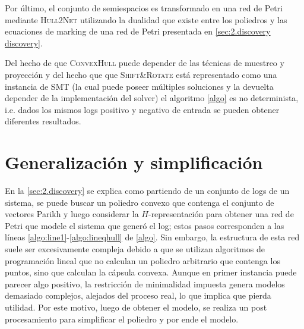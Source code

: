 Por último, el conjunto de semiespacios es transformado en una red de Petri mediante \textsc{Hull2Net} utilizando
la dualidad que existe entre los poliedros y las ecuaciones de marking de una red de Petri
presentada en \autoref{sec:2.discovery discovery}.

Del hecho de que \textsc{ConvexHull} puede depender de las técnicas de muestreo y proyección y del
hecho que que \textsc{Shift\&Rotate} está representado como una instancia de SMT (la cual puede poseer múltiples soluciones
y la devuelta depender de la implementación del solver) el algoritmo \autoref{algo} es no determinista, i.e. dados
los mismos logs positivo y negativo de entrada se pueden obtener diferentes resultados.

    
\section{Generalización y simplificación}
\label{sec:3.gensimp}

En la \autoref{sec:2.discovery} se explica como partiendo de un conjunto de logs de un sistema, se puede
buscar un poliedro convexo que contenga el conjunto de vectores Parikh y luego considerar la $H$-representación para
obtener una red de Petri que modele el sistema que generó el log; estos pasos corresponden
a las líneas \ref{algo:line1}-\ref{algo:lineqhull} de \autoref{algo}.
Sin embargo, la estructura de esta red suele ser excesivamente compleja debido a que se utilizan 
algoritmos de programación lineal que no calculan un poliedro arbitrario que contenga los puntos,
sino que calculan la cápsula convexa. Aunque en primer instancia puede parecer algo positivo, la restricción
de minimalidad impuesta genera modelos demasiado complejos, alejados del proceso real, lo que
implica que pierda utilidad. Por este motivo, luego de obtener el modelo, se realiza un post
procesamiento para simplificar el poliedro y por ende el modelo.

